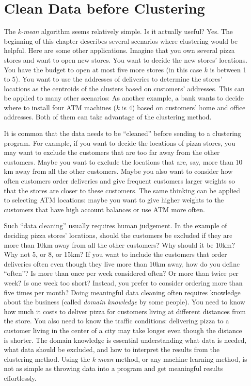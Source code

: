 
\section{Clean Data before Clustering}

The {\it k-mean} algorithm seems relatively simple. Is it actually
useful?  Yes. The beginning of this chapter describes several
scenarios where clustering would be helpful.  Here are some other
applications.  Imagine that you own several pizza stores and want to
open new stores.  You want to decide the new stores' locations.  You
have the budget to open at most five more stores (in this case $k$ is
between 1 to 5).  You want to use the addresses of deliveries to
determine the stores' locations as the centroids of the clusters based
on customers' addresses.  This can be applied to many other scenarios:
As another example, a bank wants to decide where to install four ATM
machines ($k$ is 4) based on customers' home and office addresses.
Both of them can take advantage of the clustering method.


It is common that the data needs to be ``cleaned'' before sending to a
clustering program.  For example, if you want to decide the locations
of pizza stores, you may want to exclude the customers that are too
far away from the other customers. Maybe you want to exclude the
locations that are, say, more than 10 km away from all the other
customers.  Maybe you also want to consider how often customers order
deliveries and give frequent customers larger weights so that the
stores are closer to these customers.  The same thinking can be
applied to selecting ATM locations: maybe you want to give higher
weights to the customers that have high account balances or use ATM
more often.

Such ``data cleaning'' usually requires human judgement. In the
example of deciding pizza stores' locations, should the customers be
excluded if they are more than 10km away from all the other customers?
Why should it be 10km? Why not 5, or 8, or 15km?  If you want to
include the customers that order deliveries often even though they
live more than 10km away, how do you define ``often''?  Is more than
once per week considered often? Or more than twice per week?  Is one
week too short? Instead, you prefer to consider ordering more than
five times per month?  Doing meaningful data cleaning often requires
knowledge about the business (called {\it domain knowledge} by some
people). You need to know how much it costs to deliver pizza for
customers living at different distances from the store. You also need
to know the traffic conditions: delivering pizza to a customer living
in the center of a city may take longer even though the distance is
shorter.  The domain knowledge is essential understanding what data is
needed, what data should be excluded, and how to interpret the results
from the clustering method.  Using the {\it k-mean} method, or any
machine learning method, is not as simple as throwing data into a
program and get meaningful results effortlessly.



